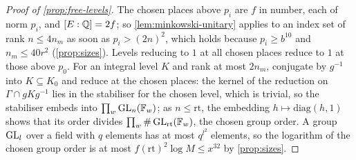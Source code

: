 \begin{proof}[Proof of \cref{prop:free-levels}]
The chosen places above $p_i$ are $f$ in number, each of norm $p_i$, and $[E:\mathbb{Q}]=2f$; so \cref{lem:minkowski-unitary} applies to an index set of rank $n\le4n_m$ as soon as $p_i>(2n)^2$, which holds because $p_i\ge b^{10}$ and $n_m\le40r^2$ (\cref{prop:sizes}). Levels reducing to $1$ at all chosen places reduce to $1$ at those above
$p_0$. For an integral level $K$ and rank at most $2n_m$, conjugate by $g^{-1}$ into $K\subseteq K_0$ and reduce at the chosen places: the kernel of the reduction on $\Gamma\cap gKg^{-1}$ lies in the stabiliser for the chosen level, which is trivial, so the stabiliser embeds into $\prod_w\operatorname{GL}_n(\mathbb{F}_w)$; as $n\le\mathrm r\mathrm t$, the embedding
$h\mapsto\mathrm{diag}(h,1)$ shows that its order divides $\prod_w\#\operatorname{GL}_{\mathrm r\mathrm t}(\mathbb{F}_w)$, the chosen group order. A group $\operatorname{GL}_l$ over a field with $q$ elements has at most $q^{l^2}$ elements, so the logarithm of the chosen group order is at most $f(\mathrm r\mathrm t)^2\log M\le x^{32}$ by \cref{prop:sizes}.
\end{proof}

